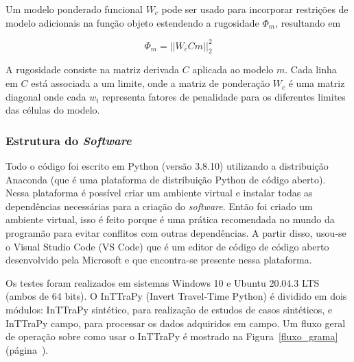 \documentclass[a4paper, 12 pt]{article} %
\begin{document}
\begin{itemize}
	\hspace{0.5cm} Um modelo ponderado funcional $W_{c}$ pode ser usado para incorporar restrições de modelo adicionais na função objeto estendendo a rugosidade $\Phi_{m}$, resultando em
	
	\begin{equation}\label{eq:modelo_ponderado}
	\Phi_{m} = ||W_{c}Cm||_{2}^{2}
	\end{equation}
	
	\hspace{0.5cm} A rugosidade consiste na matriz derivada $C$ aplicada ao modelo $m$. Cada linha em $C$ está associada a um limite, onde a matriz de ponderação $W_{c}$ é uma matriz diagonal onde cada $w_{i}$ representa fatores de penalidade para os diferentes limites das células do modelo.
	
\end{itemize}


\subsubsection{Estrutura do \emph{Software}}

Todo o código foi escrito em Python (versão 3.8.10) utilizando a distribuição Anaconda (que é uma plataforma de distribuição Python de código aberto). Nessa plataforma é possível criar um ambiente virtual e instalar todas as dependências necessárias para a criação do \textit{software}. Então foi criado um ambiente virtual, isso é feito porque é uma prática recomendada no mundo da programão para evitar conflitos com outras dependências. A partir disso, usou-se o Visual Studio Code (VS Code) que é um editor de código de código aberto desenvolvido pela Microsoft e que encontra-se presente nessa plataforma. 

Os testes foram realizados em sistemas Windows 10 e Ubuntu 20.04.3 LTS (ambos de 64 bits). O InTTraPy (Invert Travel-Time Python) é dividido em dois módulos: InTTraPy sintético, para realização de estudos de casos sintéticos, e InTTraPy campo, para processar os dados adquiridos em campo. Um fluxo geral de operação sobre como usar o InTTraPy é mostrado na Figura~\ref{fluxo_grama} (página~\pageref{fluxo_grama}). \newpage
\end{document}

